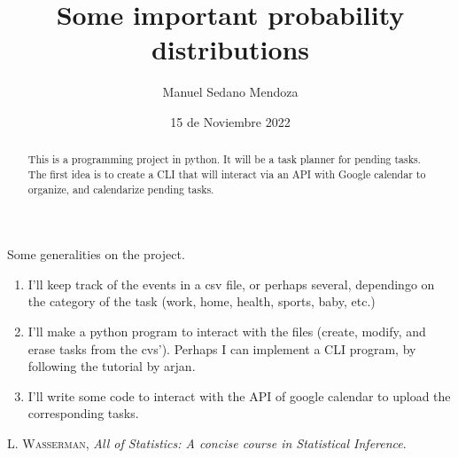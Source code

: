 \documentclass{article}
\title{Some important probability distributions}
\author{Manuel Sedano Mendoza}
\date{15 de Noviembre 2022}
\begin{document}
\maketitle
\begin{abstract}
This is a programming project in python. It will be a task planner for pending tasks. The first idea is to create a CLI that will interact via an API with Google calendar to organize, and calendarize pending tasks.
\end{abstract}

Some generalities on the project. 
\begin{enumerate}
  \item I'll keep track of the events in a csv file, or perhaps several, dependingo on the category of the task (work, home, health, sports, baby, etc.)
  \item I'll make a python program to interact with the files (create, modify, and erase tasks from the cvs'). Perhaps I can implement a CLI program, by following the tutorial by arjan.
  \item I'll write some code to interact with the API of google calendar to upload the corresponding tasks.
\end{enumerate}



\begin{thebibliography}{}
 \textsc{L. Wasserman}, \textit{All of Statistics: A concise course in Statistical Inference}. 


\end{thebibliography}
\end{document}
